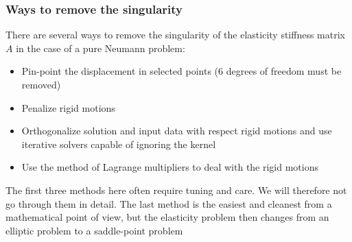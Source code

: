 \begin{frame}
\frametitle{Ways to remove the singularity}
There are several ways to remove the singularity of the elasticity stiffness matrix $A$
in the case of a pure Neumann problem:
\begin{itemize}
\item Pin-point the displacement in selected points (6 degrees of freedom must be removed)
\item Penalize rigid motions
\item Orthogonalize solution and input data with respect rigid motions and use iterative solvers
      capable of ignoring the kernel
\item Use the method of Lagrange multipliers to deal with the rigid motions
\end{itemize}
The first three methods here often require tuning and care. We will therefore not go through
them in detail.
The last method is the easiest and cleanest from a mathematical point of view,
but the elasticity problem then changes from an elliptic problem to a saddle-point problem
\end{frame}
